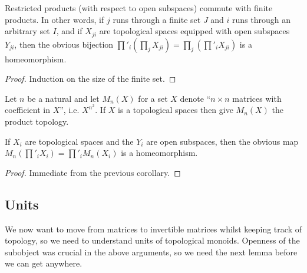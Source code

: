 \begin{corollary}
  \label{Homeomorph.restrictedProductPi}
  \leanok
  Restricted products (with respect to open subspaces) commute with finite products.
  In other words, if $j$ runs through a finite set $J$ and $i$ runs through an arbitrary
  set $I$, and if $X_{ji}$ are topological spaces equipped with open subspaces $Y_{ji}$,
  then the obvious bijection $\prod'_i(\prod_j X_{ji})=\prod_j\left(\prod'_i X_{ji}\right)$
  is a homeomorphism.
\end{corollary}
\begin{proof}
  Induction on the size of the finite set.
\end{proof}

 Let $n$ be a natural and let $M_n(X)$ for a set $X$ denote ``$n\times n$
  matrices with coefficient in $X$'', i.e. $X^{n^2}$. If $X$ is a topological
  spaces then give $M_n(X)$ the product topology.

\begin{corollary}
  \label{Homeomorph.restrictedProductMatrix}
  \leanok
  If $X_i$ are topological spaces and the $Y_i$ are open subspaces,
  then the obvious map $M_n(\prod'_iX_i)=\prod'_iM_n(X_i)$ is a homeomorphism.
\end{corollary}
\begin{proof}
  Immediate from the previous corollary.
\end{proof}

\subsection{Units}

We now want to move from matrices to invertible matrices whilst keeping track of topology,
so we need to understand units of topological monoids. Openness of the subobject was
crucial in the above arguments, so we need the next lemma before we can get anywhere.

